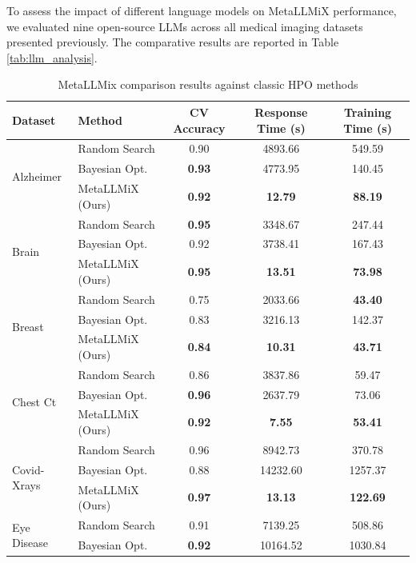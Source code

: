\documentclass{article}
\begin{document}
To assess the impact of different language models on MetaLLMiX performance, we evaluated nine open-source LLMs across all medical imaging datasets presented previously. The comparative results are reported in Table \ref{tab:llm_analysis}.

\vspace{0.5cm}
\setcounter{table}{2}
\begin{table}[H] %
\centering
\caption{MetaLLMix comparison results against classic HPO methods}
\label{tab:hpo_comparison}
\begin{tabular}{llccc}
\toprule
\textbf{Dataset} & \textbf{Method} & \textbf{CV Accuracy} & \textbf{Response Time (s)} & \textbf{Training Time (s)} \\
\midrule
\multirow{3}{*}{Alzheimer}
  & Random Search & 0.90 & 4893.66 & 549.59 \\
  & Bayesian Opt. & \textbf{0.93} & 4773.95 & 140.45 \\
  & MetaLLMiX (Ours) & \textbf{0.92} & \textbf{12.79} & \textbf{88.19} \\
\midrule
\multirow{3}{*}{Brain}
  & Random Search & \textbf{0.95} & 3348.67 & 247.44 \\
  & Bayesian Opt. & 0.92 & 3738.41 & 167.43 \\
  & MetaLLMiX (Ours) & \textbf{0.95} & \textbf{13.51} & \textbf{73.98} \\
\midrule
\multirow{3}{*}{Breast}
  & Random Search & 0.75 & 2033.66 & \textbf{43.40} \\
  & Bayesian Opt. & 0.83 & 3216.13 & 142.37 \\
  & MetaLLMiX (Ours) & \textbf{0.84} & \textbf{10.31} & \textbf{43.71} \\
\midrule
\multirow{3}{*}{Chest Ct}
  & Random Search & 0.86 & 3837.86 & 59.47 \\
  & Bayesian Opt. & \textbf{0.96} & 2637.79 & 73.06 \\
  & MetaLLMiX (Ours) & \textbf{0.92} & \textbf{7.55} & \textbf{53.41} \\
\midrule
\multirow{3}{*}{Covid-Xrays}
  & Random Search & 0.96 & 8942.73 & 370.78 \\
  & Bayesian Opt. & 0.88 & 14232.60 & 1257.37 \\
  & MetaLLMiX (Ours) & \textbf{0.97} & \textbf{13.13} & \textbf{122.69} \\
\midrule
\multirow{3}{*}{Eye Disease}
  & Random Search & 0.91 & 7139.25 & 508.86 \\
  & Bayesian Opt. & \textbf{0.92} & 10164.52 & 1030.84 \\

\end{tabular}
\end{table}
\end{document}
